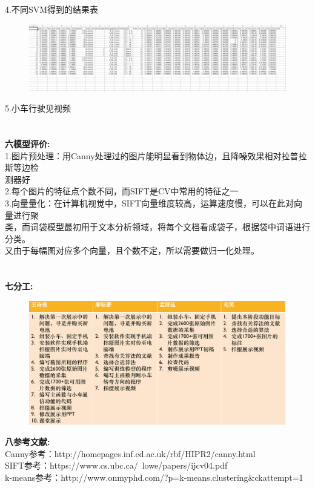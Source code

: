 \documentclass[19pt,a4paper]{article}
\begin{document}
\indent 4.不同SVM得到的结果表
\begin{figure}[H]
 \centering
 \includegraphics[scale=0.4]{6.jpeg}
\end{figure}
\indent 5.小车行驶见视频\\
\\
\\
\indent\textbf{六\quad 模型评价:}\\
\indent 1.图片预处理：用Canny处理过的图片能明显看到物体边，且降噪效果相对拉普拉斯等边检\\
\indent 测器好\\
\indent 2.每个图片的特征点个数不同，而SIFT是CV中常用的特征之一\\
\indent 3.向量量化：在计算机视觉中，SIFT向量维度较高，运算速度慢，可以在此对向量进行聚\\
\indent 类，而词袋模型最初用于文本分析领域，将每个文档看成袋子，根据袋中词语进行分类。\\
\indent 又由于每幅图对应多个向量，且个数不定，所以需要做归一化处理。\\
\\
\\
\indent\textbf{七\quad 分工:}\\
\begin{figure}[H]
 \centering
 \includegraphics[scale=0.4]{0.png}
\end{figure}

\indent\textbf{八\quad 参考文献:}\\
\indent Canny参考：http://homepages.inf.ed.ac.uk/rbf/HIPR2/canny.html\\
\indent SIFT参考：https://www.cs.ubc.ca/~lowe/papers/ijcv04.pdf\\
\indent k-means参考：http://www.onmyphd.com/?p=k-means.clustering\&ckattempt=1\\
\end{document}
